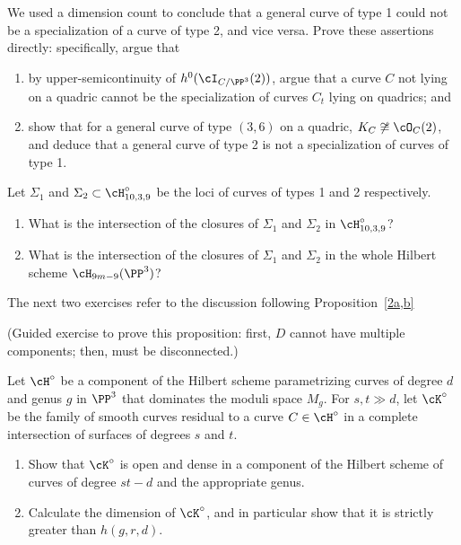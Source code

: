 \begin{exercise}
 We used a dimension count to conclude that a general curve of type 1 could not be a specialization of a curve of type 2, and vice versa. Prove these assertions directly: specifically, argue that
\begin{enumerate}
\item by upper-semicontinuity of $h^0(\cI_{C/\PP^3}(2))$, argue that a curve $C$ not lying on a quadric cannot be the specialization of curves $C_t$ lying on quadrics; and
\item show that for a general curve of type $(3,6)$ on a quadric, $K_C \not\cong \cO_C(2)$, and deduce that a general curve of type 2 is not a specialization of curves of type 1.
\end{enumerate}
\end{exercise}

\begin{exercise}
Let $\Sigma_1$ and $\Sigma_2 \subset \cH^\circ_{10,3,9}$ be the loci of curves of types 1 and 2 respectively. 
\begin{enumerate}
\item What is the intersection of the closures of $\Sigma_1$ and $\Sigma_2$ in $ \cH^\circ_{10,3,9}$?
\item What is the intersection of the closures of $\Sigma_1$ and $\Sigma_2$ in the whole Hilbert scheme $\cH_{9m-9}(\PP^3)$?
\end{enumerate}
\end{exercise}


The next two exercises refer to the discussion following Proposition~\ref{2a,b}
\begin{exercise}\label{character of D}
(Guided exercise to prove this proposition: first, $D$ cannot have multiple components; then, must be disconnected.)
\end{exercise}


\begin{exercise}\label{many large components}
Let $\cH^\circ$ be a component of the Hilbert scheme parametrizing curves of degree $d$ and genus $g$ in $\PP^3$ that dominates the moduli space $M_g$. For $s, t \gg d$, let $\cK^\circ$ be the family of smooth curves residual to a curve $C \in  \cH^\circ$ in a complete intersection of surfaces of degrees $s$ and $t$.
\begin{enumerate}
\item Show that $\cK^\circ$ is open and dense in a component of the Hilbert scheme of curves of degree $st-d$ and the appropriate genus.
\item Calculate the dimension of $\cK^\circ$, and in particular show that it is strictly greater than $h(g,r,d)$.
\end{enumerate}
\end{exercise}

